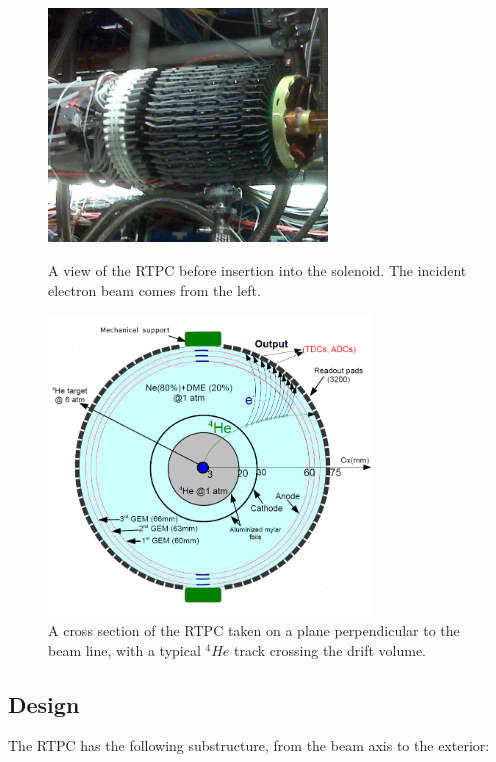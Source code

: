 \begin{figure}[tp]
\begin{minipage}[c]{.46\linewidth}
\vspace{0.3in}
\includegraphics[height=6.2cm]{fig_rtpc/RTPC_exp_cut.jpg}
\vspace{0.1in}
\caption{A view of the RTPC before insertion into the solenoid. The incident 
electron beam comes from the left.} 
\label{fig:RTPC2}
\end{minipage} \hfill
\begin{minipage}[c]{.46\linewidth}
\hspace*{-0.3in}\includegraphics[height=8.0cm]{fig_rtpc/RTPC_1_all.png}
\caption{A cross section of the RTPC taken on a plane perpendicular to the 
beam line, with a typical $^4He$ track crossing the drift volume.}
\label{fig:RTPC_xscetion}
\end{minipage}
\end{figure}


\subsection{Design}

The RTPC has the following substructure, from the beam axis to the exterior:

